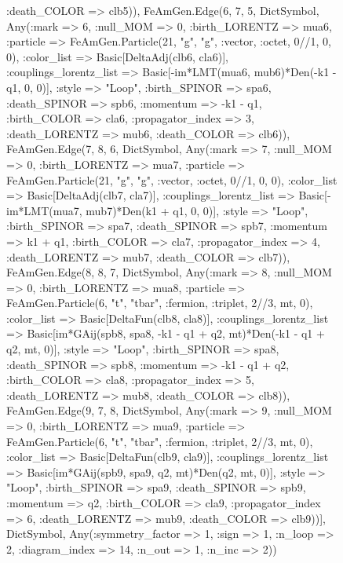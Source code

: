 \documentclass{revtex4}
\begin{document}
\begin{figure}[!htb]
\begin{center}
{:death_COLOR => clb5)), FeAmGen.Edge(6, 7, 5, Dict{Symbol, Any}(:mark => 6, :null_MOM => 0, :birth_LORENTZ => mua6, :particle => FeAmGen.Particle(21, "g", "g", :vector, :octet, 0//1, 0, 0), :color_list => Basic[DeltaAdj(clb6, cla6)], :couplings_lorentz_list => Basic[-im*LMT(mua6, mub6)*Den(-k1 - q1, 0, 0)], :style => "Loop", :birth_SPINOR => spa6, :death_SPINOR => spb6, :momentum => -k1 - q1, :birth_COLOR => cla6, :propagator_index => 3, :death_LORENTZ => mub6, :death_COLOR => clb6)), FeAmGen.Edge(7, 8, 6, Dict{Symbol, Any}(:mark => 7, :null_MOM => 0, :birth_LORENTZ => mua7, :particle => FeAmGen.Particle(21, "g", "g", :vector, :octet, 0//1, 0, 0), :color_list => Basic[DeltaAdj(clb7, cla7)], :couplings_lorentz_list => Basic[-im*LMT(mua7, mub7)*Den(k1 + q1, 0, 0)], :style => "Loop", :birth_SPINOR => spa7, :death_SPINOR => spb7, :momentum => k1 + q1, :birth_COLOR => cla7, :propagator_index => 4, :death_LORENTZ => mub7, :death_COLOR => clb7)), FeAmGen.Edge(8, 8, 7, Dict{Symbol, Any}(:mark => 8, :null_MOM => 0, :birth_LORENTZ => mua8, :particle => FeAmGen.Particle(6, "t", "tbar", :fermion, :triplet, 2//3, mt, 0), :color_list => Basic[DeltaFun(clb8, cla8)], :couplings_lorentz_list => Basic[im*GAij(spb8, spa8, -k1 - q1 + q2, mt)*Den(-k1 - q1 + q2, mt, 0)], :style => "Loop", :birth_SPINOR => spa8, :death_SPINOR => spb8, :momentum => -k1 - q1 + q2, :birth_COLOR => cla8, :propagator_index => 5, :death_LORENTZ => mub8, :death_COLOR => clb8)), FeAmGen.Edge(9, 7, 8, Dict{Symbol, Any}(:mark => 9, :null_MOM => 0, :birth_LORENTZ => mua9, :particle => FeAmGen.Particle(6, "t", "tbar", :fermion, :triplet, 2//3, mt, 0), :color_list => Basic[DeltaFun(clb9, cla9)], :couplings_lorentz_list => Basic[im*GAij(spb9, spa9, q2, mt)*Den(q2, mt, 0)], :style => "Loop", :birth_SPINOR => spa9, :death_SPINOR => spb9, :momentum => q2, :birth_COLOR => cla9, :propagator_index => 6, :death_LORENTZ => mub9, :death_COLOR => clb9))], Dict{Symbol, Any}(:symmetry_factor => 1, :sign => 1, :n_loop => 2, :diagram_index => 14, :n_out => 1, :n_inc => 2)) 
}
\end{center}
\end{figure}
\end{document}
